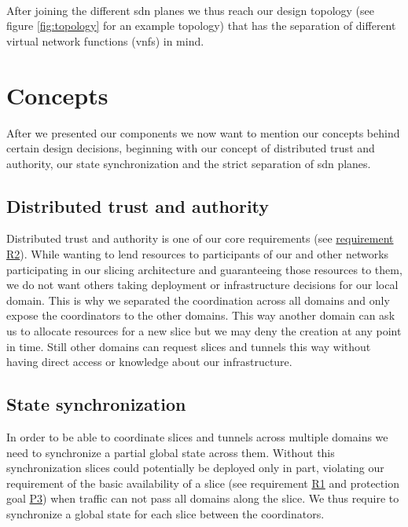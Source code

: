 \paragraph{} After joining the different \acrshort{sdn} planes we thus reach our design topology (see figure \ref{fig:topology} for an example topology) that has the separation of different virtual network functions (\acrshort{vnf}s) in mind.

\section{Concepts}
\label{design_concepts}
After we presented our components we now want to mention our concepts behind certain design decisions, beginning with our concept of distributed trust and authority, our state synchronization and the strict separation of \acrshort{sdn} planes.

\subsection{Distributed trust and authority}
Distributed trust and authority is one of our core requirements (see \hyperref[R2]{requirement R2}). While wanting to lend resources to participants of our and other networks participating in our slicing architecture and guaranteeing those resources to them, we do not want others taking deployment or infrastructure decisions for our local domain. This is why we separated the coordination across all domains and only expose the coordinators to the other domains. This way another domain can ask us to allocate resources for a new slice but we may deny the creation at any point in time. Still other domains can request slices and tunnels this way without having direct access or knowledge about our infrastructure.

\subsection{State synchronization}
In order to be able to coordinate slices and tunnels across multiple domains we need to synchronize a partial global state across them. Without this synchronization slices could potentially be deployed only in part, violating our requirement of the basic availability of a slice (see requirement \hyperref[R1]{R1} and protection goal \hyperref[P3]{P3}) when traffic can not pass all domains along the slice. We thus require to synchronize a global state for each slice between the coordinators.

